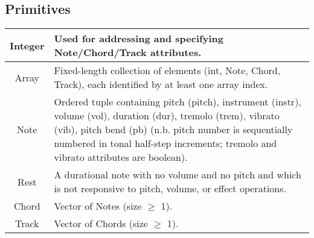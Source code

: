 \documentclass[letterpaper]{article}
\begin{document}
\begin{samepage}
\subsection{Primitives}
\begin{table}[H]
\centering
\begin{tabularx}{.75\textwidth}{|c|X|}
\hline
Integer & Used for addressing and specifying Note/Chord/Track attributes. \\
\hline
Array & Fixed-length collection of elements (int, Note, Chord, Track), each identified by at least one array index. \\
\hline
Note & Ordered tuple containing pitch (pitch), instrument (instr), volume (vol), duration (dur), tremolo (trem), vibrato (vib), pitch bend (pb) (n.b. pitch number is sequentially numbered in tonal half-step increments; tremolo and vibrato attributes are boolean). \\
\hline
Rest & A durational note with no volume and no pitch and which is not responsive to pitch, volume, or effect operations. \\
\hline
Chord & Vector of Notes (size $\geq$ 1). \\
\hline
Track & Vector of Chords (size $\geq$ 1). \\
\hline
\end{tabularx}
\end{table}
\end{samepage}
\end{document}

